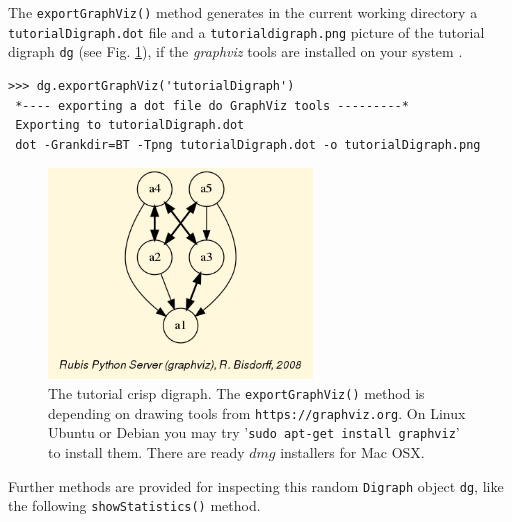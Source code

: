 The \texttt{exportGraphViz()} method generates in the current working directory a \texttt{tutorialDigraph.dot} file and a \texttt{tutorialdigraph.png} picture of the tutorial digraph \texttt{dg} (see Fig. \ref{fig:1.1}), if the \emph{graphviz} tools are installed on your system \citep{graphViz}.
\begin{lstlisting}
>>> dg.exportGraphViz('tutorialDigraph')
 *---- exporting a dot file do GraphViz tools ---------*
 Exporting to tutorialDigraph.dot
 dot -Grankdir=BT -Tpng tutorialDigraph.dot -o tutorialDigraph.png
\end{lstlisting}
\begin{figure}[h]
\sidecaption[t]
\includegraphics[width=7cm]{Figures/tutorialDigraph.png}
\caption{The tutorial crisp digraph. The \texttt{exportGraphViz()} method is depending on drawing tools from \texttt{https://graphviz.org}. On Linux Ubuntu or Debian you may try '\texttt{sudo apt-get install graphviz}’ to install them. There are ready $dmg$ installers for Mac OSX.}
\label{fig:1.1}       %
\end{figure}

Further methods are provided for inspecting this random \texttt{Digraph} object \texttt{dg}, like the following \texttt{showStatistics()} method.

